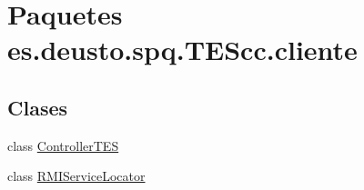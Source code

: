\hypertarget{namespacees_1_1deusto_1_1spq_1_1_t_e_scc_1_1cliente}{\section{Paquetes es.\+deusto.\+spq.\+T\+E\+Scc.\+cliente}
\label{namespacees_1_1deusto_1_1spq_1_1_t_e_scc_1_1cliente}
}
\subsection*{Clases}
\begin{DoxyCompactItemize}
\item 
class \hyperlink{classes_1_1deusto_1_1spq_1_1_t_e_scc_1_1cliente_1_1_controller_t_e_s}{Controller\+T\+E\+S}
\item 
class \hyperlink{classes_1_1deusto_1_1spq_1_1_t_e_scc_1_1cliente_1_1_r_m_i_service_locator}{R\+M\+I\+Service\+Locator}
\end{DoxyCompactItemize}
